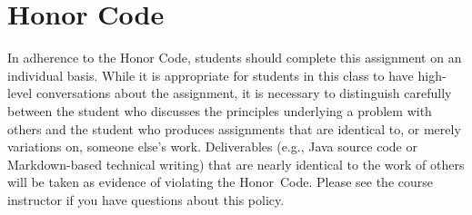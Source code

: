 \documentclass[11pt]{article}
\begin{document}
\section*{Honor Code}

In adherence to the Honor Code, students should complete this assignment on an individual basis. While it is appropriate
for students in this class to have high-level conversations about the assignment, it is necessary to distinguish
carefully between the student who discusses the principles underlying a problem with others and the student who produces
assignments that are identical to, or merely variations on, someone else's work. Deliverables (e.g., Java source code or
Markdown-based technical writing) that are nearly identical to the work of others will be taken as evidence of violating
the \mbox{Honor Code}. Please see the course instructor if you have questions about this policy.
\end{document}
